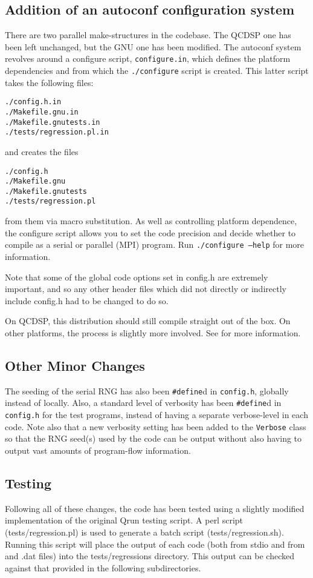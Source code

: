 \documentclass[12pt]{article}
\newcommand{\href}[2]{\htmladdnormallink{#2}{#1}}
\newcommand{\cde}[1]{{\tt #1}}            %
\begin{document}
\subsection{Addition of an autoconf configuration system}
There are two parallel make-structures in the codebase.  The QCDSP one has been
left unchanged, but the GNU one has been modified.  The autoconf system
revolves around a configure script, \cde{configure.in}, which defines the
platform dependencies and from which the \cde{./configure} script is created.
This latter script takes the following files:
\begin{verbatim}
./config.h.in
./Makefile.gnu.in
./Makefile.gnutests.in
./tests/regression.pl.in
\end{verbatim}
and creates the files
\begin{verbatim}
./config.h
./Makefile.gnu
./Makefile.gnutests
./tests/regression.pl
\end{verbatim}
from them via macro substitution.  As well as controlling platform dependence,
the configure script allows you to set the code precision and decide whether
to compile as a serial or parallel (MPI) program.  Run \cde{./configure
--help} for more information.

Note that some of the global code options set in config.h are extremely
important, and so any other header files which did not directly or indirectly
include config.h had to be changed to do so.

On QCDSP, this distribution should still compile straight out of the
box.  On other platforms, the process is slightly more involved.  See
\href{../porting/porting.html}{../porting/porting.html} for more information.

\subsection{Other Minor Changes}
The seeding of the serial RNG has also been \cde{\#define}d in \cde{config.h},
globally instead of locally.  Also, a standard level of verbosity has been
\cde{\#define}d in \cde{config.h} for the test programs, instead of having a
separate verbose-level in each code.  Note also that a new verbosity setting
has been added to the \cde{Verbose} class so that the RNG seed(s) used by the
code can be output without also having to output vast amounts of program-flow
information.

\subsection{Testing}
Following all of these changes, the code has been tested using a
slightly modified implementation of the original Qrun testing script.
A perl script (tests/regression.pl) is used to generate a batch script
(tests/regression.sh).  Running this script will place the output of
each code (both from stdio and from and .dat files) into the
tests/regressions directory.  This output can be checked against that
provided in the following subdirectories.
\end{document}
